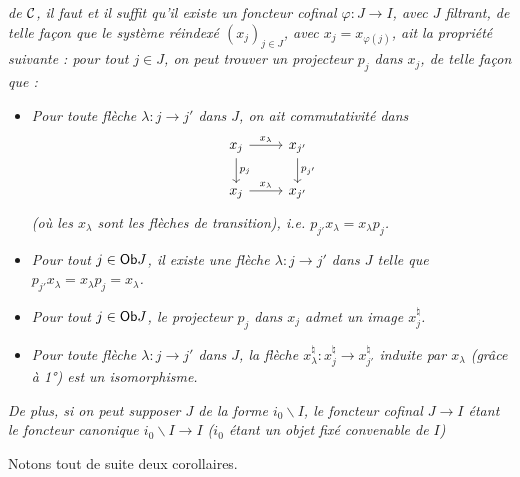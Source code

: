 \textit{de $\mathcal{C}$, il faut et il suffit qu'il existe un foncteur cofinal $\varphi : J \longrightarrow I$, avec $J$ filtrant, de telle façon que le système réindexé $(x_j)_{j\in J}$, avec $x_j = x_{\varphi(j)}$, ait la propriété suivante : pour tout $j \in J$, on peut trouver un projecteur $p_j$ dans $x_j$, de telle façon que :}
\begin{itemize}
\item[\textit{1°)}] \textit{Pour toute flèche $\lambda : j \longrightarrow j'$ dans $J$, on ait commutativité dans}
\[
\begin{tikzcd}
x_j \arrow[r, "x_\lambda"] \arrow[d, "p_j"] & x_{j'} \arrow[d, "p_{j'}"] \\
x_j \arrow[r, "x_\lambda"] & x_{j'}
\end{tikzcd}
\]
\textit{(où les $x_\lambda$ sont les flèches de transition), i.e. $p_{j'}x_\lambda = x_\lambda p_j$.}
\item[\textit{2°)}] \textit{Pour tout $j \in \mathsf{Ob} J$, il existe une flèche $\lambda : j \longrightarrow j'$ dans $J$ telle que $p_{j'}x_\lambda = x_\lambda p_j = x_\lambda$.}
\item[\textit{3°)}] \textit{Pour tout $j \in \mathsf{Ob} J$, le projecteur $p_j$ dans $x_j$ admet un image $x_j^\natural$.} %
\item[\textit{4°)}] \textit{Pour toute flèche $\lambda : j \longrightarrow j'$ dans $J$, la flèche $x_\lambda^\natural : x_j^\natural \longrightarrow x_{j'}^\natural$ induite par $x_\lambda$ (grâce à 1°) est un isomorphisme.}
\end{itemize}
\textit{De plus, si on peut supposer $J$ de la forme $i_0\backslash I$, le foncteur cofinal $J \longrightarrow I$ étant le foncteur canonique $i_0\backslash I \longrightarrow I$ ($i_0$ étant un objet fixé convenable de $I$)}

Notons tout de suite deux corollaires.

